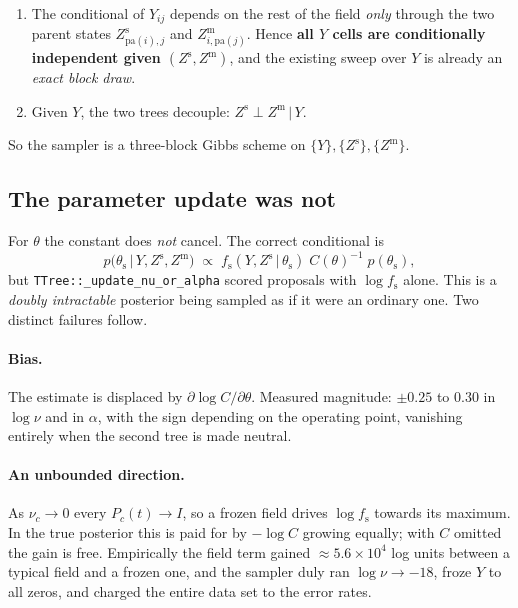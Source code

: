 \documentclass[11pt,a4paper]{article}
\newcommand{\Ys}{Y}
\newcommand{\Zs}{Z^{\mathrm{s}}}
\newcommand{\Zm}{Z^{\mathrm{m}}}
\newcommand{\fs}{f_{\mathrm{s}}}
\newcommand{\pa}{\mathrm{pa}}
\newcommand{\given}{\,\vert\,}
\begin{document}
\begin{enumerate}[label=(\alph*)]
  \item The conditional of $\Ys_{ij}$ depends on the rest of the field \emph{only} through
        the two parent states $\Zs_{\pa(i),j}$ and $\Zm_{i,\pa(j)}$. Hence
        \textbf{all $\Ys$ cells are conditionally independent given $(\Zs,\Zm)$}, and the
        existing sweep over $\Ys$ is already an \emph{exact block draw}.
  \item Given $\Ys$, the two trees decouple: $\Zs \perp \Zm \given \Ys$.
\end{enumerate}

So the sampler is a three-block Gibbs scheme on $\{\Ys\}, \{\Zs\}, \{\Zm\}$.

\subsection{The parameter update was not}

For $\theta$ the constant does \emph{not} cancel. The correct conditional is
\[
  p\bigl(\theta_{\mathrm{s}} \given \Ys, \Zs, \Zm\bigr)
  \;\propto\;
  \fs(\Ys,\Zs \given \theta_{\mathrm{s}})\;
  C(\theta)^{-1}\;
  p(\theta_{\mathrm{s}}),
\]
but \texttt{TTree::\_update\_nu\_or\_alpha} scored proposals with $\log \fs$ alone. This is
a \emph{doubly intractable} posterior being sampled as if it were an ordinary one. Two
distinct failures follow.

\paragraph{Bias.} The estimate is displaced by $\partial \log C / \partial \theta$. Measured
magnitude: $\pm 0.25$ to $0.30$ in $\log \nu$ and in $\alpha$, with the sign depending on the
operating point, vanishing entirely when the second tree is made neutral.

\paragraph{An unbounded direction.} As $\nu_c \to 0$ every $P_c(t) \to I$, so a frozen field
drives $\log \fs$ towards its maximum. In the true posterior this is paid for by $-\log C$
growing equally; with $C$ omitted the gain is free. Empirically the field term gained
$\approx 5.6\times 10^{4}$ log units between a typical field and a frozen one, and the
sampler duly ran $\log\nu \to -18$, froze $\Ys$ to all zeros, and charged the entire data
set to the error rates.
\end{document}
